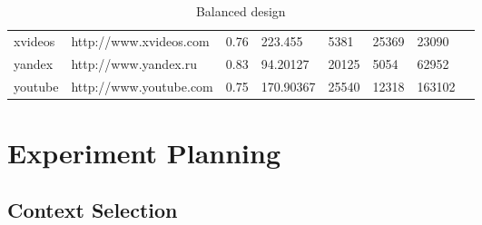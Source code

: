 \begin{table}[]
{\begin{tabular}{llllllll}
xvideos                               & http://www.xvideos.com           & 0.76                                                                                                    & 223.455                                                                                               & 5381                                                                               & 25369                                                                             & 23090                                                                                    &                                                                                             \\
yandex                                & http://www.yandex.ru             & 0.83                                                                                                    & 94.20127                                                                                              & 20125                                                                              & 5054                                                                              & 62952                                                                                    &                                                                                             \\
youtube                               & http://www.youtube.com           & 0.75                                                                                                    & 170.90367                                                                                             & 25540                                                                              & 12318                                                                             & 163102                                                                                   &                                                                                            
\end{tabular}%
}

\caption{Balanced design}
    \label{tab:design}
\end{table}



\section{Experiment Planning}


\subsection{Context Selection}

